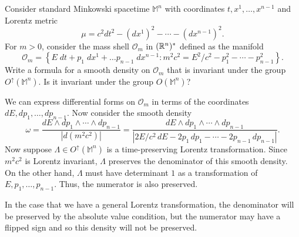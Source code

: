 \documentclass{pset}
\begin{document}
\begin{problem}{4}
  Consider standard Minkowski spacetime $\mathbb{M}^n$ with coordinates $t, x^1, \ldots, x^{n-1}$ and Lorentz metric
  \[
    \mu = c^2 dt^2 - (dx^1)^2-\cdots-(dx^{n-1})^2.
  \]
  For $m>0$, consider the mass shell $\mathcal{O}_m$ in $(\mathbb{R}^n)^*$ defined as the manifold 
  \[
    \mathcal{O}_m = \left\{E\;dt + p_1\; dx^1+\dots p_{n-1}\;dx^{n-1} : m^2c^2=E^2/c^2 - p_1^2 - \cdots - p_{n-1}^2\right\}.
  \]
  Write a formula for a smooth density on $\mathcal{O}_m$ that is invariant under the group $O^\uparrow(\mathbb{M}^n)$. Is it invariant under the group $O(\mathbb{M}^n)$?
\end{problem}

\begin{solution}
  We can express differential forms on $\mathcal{O}_m$ in terms of the coordinates $dE, dp_1,\ldots, dp_{n-1}$. Now consider the smooth density
  \[
    \omega = \frac{dE\wedge dp_1\wedge \cdots \wedge dp_{n-1}}{|d(m^2 c^2)|} = \frac{dE\wedge dp_1\wedge \cdots\wedge dp_{n-1}}{|2E/c^2\, dE - 2p_1\, dp_1-\cdots -2p_{n-1}\,dp_{n-1}|}.
  \]
  Now suppose $\Lambda\in O^\uparrow(\mathbb{M}^n)$ is a time-preserving Lorentz transformation. Since $m^2 c^2$ is Lorentz invariant, $\Lambda$ preserves the denominator of this smooth density. On the other hand, $\Lambda$ must have determinant $1$ as a transformation of $E, p_1, \ldots, p_{n-1}$. Thus, the numerator is also preserved.

  In the case that we have a general Lorentz transformation, the denominator will be preserved by the absolute value condition, but the numerator may have a flipped sign and so this density will not be preserved.
\end{solution}
\end{document}
